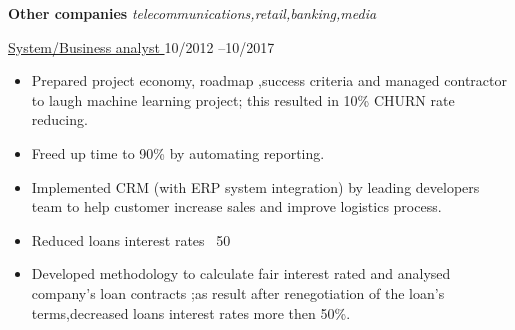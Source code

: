 \textbf{Other companies} \textit{telecommunications,retail,banking,media} \par
\underline{System/Business analyst } \hfill 10/2012 --10/2017
\begin{itemize}
	\item Prepared  project economy, roadmap ,success criteria and managed contractor to laugh machine learning project; this resulted in 10\% CHURN rate reducing.
 	\item 	Freed up time to 90\% by automating reporting.
 	\item Implemented CRM (with ERP system integration) by leading developers team to help customer increase sales and improve logistics process.
	\item Reduced loans interest rates ~50%
        \item Developed methodology to calculate fair interest rated and analysed company's loan contracts ;as result after renegotiation of the loan's terms,decreased loans interest rates more then 50\%.
\end{itemize}\par
